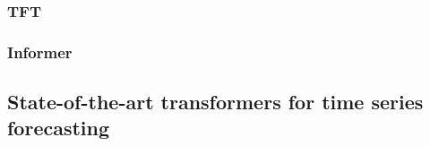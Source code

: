 \subsubsection{\color{red}TFT}
\subsubsection{\color{red}Informer}

\subsection{\color{red}State-of-the-art transformers for time series forecasting}




